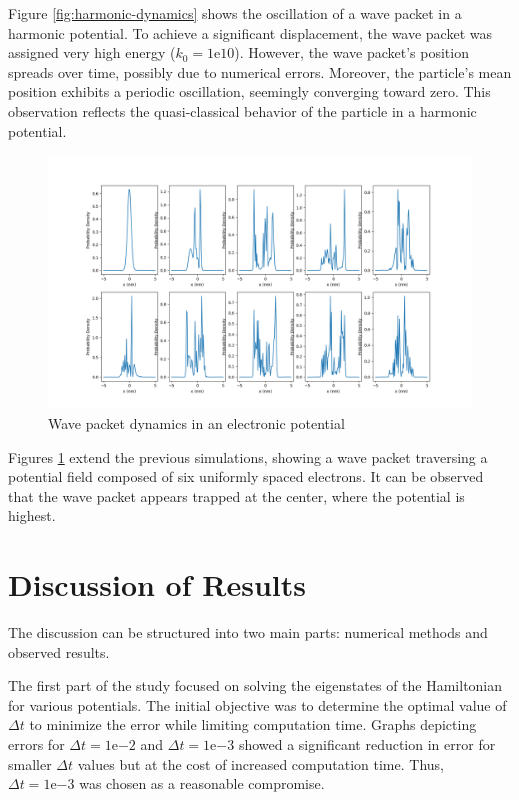 \documentclass[12pt,french]{article}
\begin{document}
Figure \ref{fig:harmonic-dynamics} shows the oscillation of a wave packet in a harmonic potential. To achieve a significant displacement, the wave packet was assigned very high energy (\(k_0 = 1\mathrm{e}{10}\)). However, the wave packet's position spreads over time, possibly due to numerical errors. Moreover, the particle's mean position exhibits a periodic oscillation, seemingly converging toward zero. This observation reflects the quasi-classical behavior of the particle in a harmonic potential.


\begin{figure}[h!]
\centering
\includegraphics[width=0.70\linewidth]{Partie_II/Dynamique_Paquet_Onde_Potentiel_Electronique_potentiel_plus_bas.png}
\caption{Wave packet dynamics in an electronic potential}
\label{fig:lower-electronic-potential}
\end{figure}

Figures \ref{fig:lower-electronic-potential} extend the previous simulations, showing a wave packet traversing a potential field composed of six uniformly spaced electrons. It can be observed that the wave packet appears trapped at the center, where the potential is highest. 



\section{Discussion of Results}

The discussion can be structured into two main parts: numerical methods and observed results.


The first part of the study focused on solving the eigenstates of the Hamiltonian for various potentials. The initial objective was to determine the optimal value of \(\Delta t\) to minimize the error while limiting computation time. Graphs depicting errors for \(\Delta t = 1\mathrm{e}{-2}\) and \(\Delta t = 1\mathrm{e}{-3}\) showed a significant reduction in error for smaller \(\Delta t\) values but at the cost of increased computation time. Thus, \(\Delta t = 1\mathrm{e}{-3}\) was chosen as a reasonable compromise.
\end{document}
